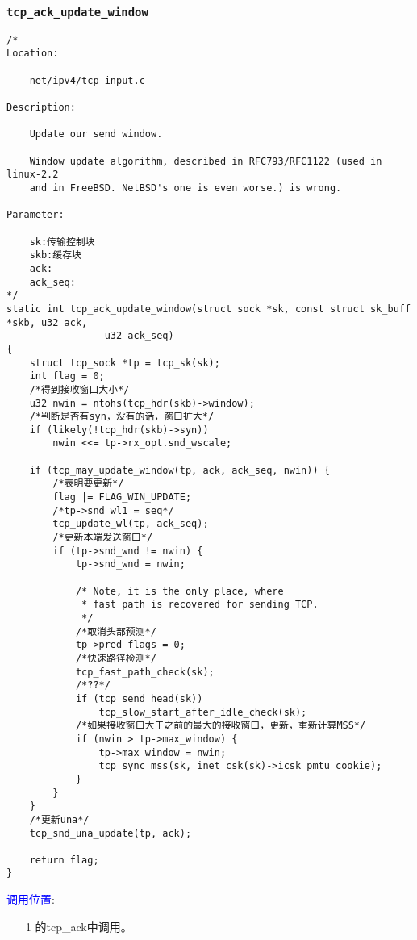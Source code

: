         \subsubsection{\texttt{tcp_ack_update_window}}
            \label{WindowUpdate:tcp_ack_update_window}
\begin{verbatim}
/* 
Location:

    net/ipv4/tcp_input.c

Description:

    Update our send window.

    Window update algorithm, described in RFC793/RFC1122 (used in linux-2.2
    and in FreeBSD. NetBSD's one is even worse.) is wrong.

Parameter:

    sk:传输控制块
    skb:缓存块
    ack:    
    ack_seq:
*/
static int tcp_ack_update_window(struct sock *sk, const struct sk_buff *skb, u32 ack,
                 u32 ack_seq)
{
    struct tcp_sock *tp = tcp_sk(sk);
    int flag = 0;
    /*得到接收窗口大小*/
    u32 nwin = ntohs(tcp_hdr(skb)->window);
    /*判断是否有syn，没有的话，窗口扩大*/
    if (likely(!tcp_hdr(skb)->syn))
        nwin <<= tp->rx_opt.snd_wscale;

    if (tcp_may_update_window(tp, ack, ack_seq, nwin)) {
        /*表明要更新*/
        flag |= FLAG_WIN_UPDATE;
        /*tp->snd_wl1 = seq*/
        tcp_update_wl(tp, ack_seq);
        /*更新本端发送窗口*/
        if (tp->snd_wnd != nwin) {
            tp->snd_wnd = nwin;

            /* Note, it is the only place, where
             * fast path is recovered for sending TCP.
             */
            /*取消头部预测*/
            tp->pred_flags = 0;
            /*快速路径检测*/
            tcp_fast_path_check(sk);
            /*??*/
            if (tcp_send_head(sk))
                tcp_slow_start_after_idle_check(sk);
            /*如果接收窗口大于之前的最大的接收窗口，更新，重新计算MSS*/
            if (nwin > tp->max_window) {
                tp->max_window = nwin;
                tcp_sync_mss(sk, inet_csk(sk)->icsk_pmtu_cookie);
            }
        }
    }
    /*更新una*/
    tcp_snd_una_update(tp, ack);

    return flag;
}
\end{verbatim}

        \textcolor{blue}{调用位置}:
            \begin{enumerate}
                \item[1]        \label{ClientReceiveSYN+ACK:tcp_ack}的tcp\_ack中调用。
            \end{enumerate}

